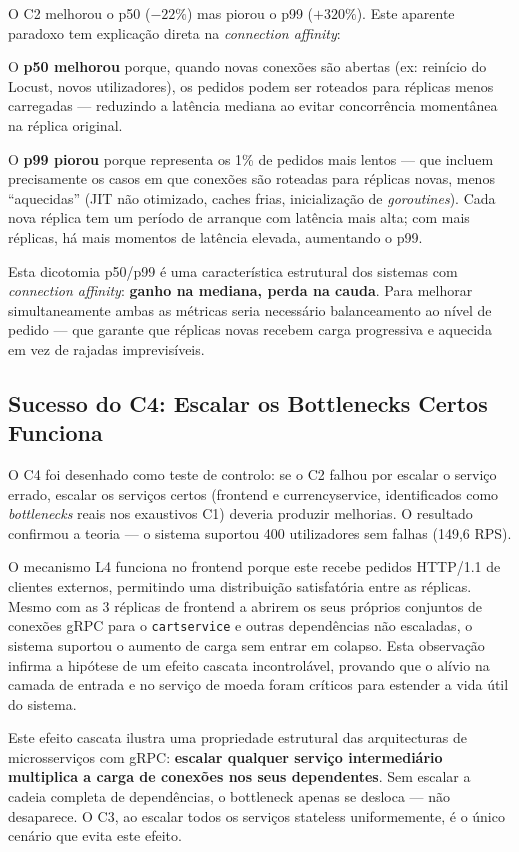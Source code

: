 \documentclass[manuscript,screen,review]{acmart}
\begin{document}
O C2 melhorou o p50 ($-22\%$) mas piorou o p99 ($+320\%$). Este aparente paradoxo tem explicação direta na \textit{connection affinity}:

O \textbf{p50 melhorou} porque, quando novas conexões são abertas (ex: reinício do Locust, novos utilizadores), os pedidos podem ser roteados para réplicas menos carregadas — reduzindo a latência mediana ao evitar concorrência momentânea na réplica original.

O \textbf{p99 piorou} porque representa os 1\% de pedidos mais lentos — que incluem precisamente os casos em que conexões são roteadas para réplicas novas, menos ``aquecidas'' (JIT não otimizado, caches frias, inicialização de \textit{goroutines}). Cada nova réplica tem um período de arranque com latência mais alta; com mais réplicas, há mais momentos de latência elevada, aumentando o p99.

Esta dicotomia p50/p99 é uma característica estrutural dos sistemas com \textit{connection affinity}: \textbf{ganho na mediana, perda na cauda}. Para melhorar simultaneamente ambas as métricas seria necessário balanceamento ao nível de pedido — que garante que réplicas novas recebem carga progressiva e aquecida em vez de rajadas imprevisíveis.

\subsection{Sucesso do C4: Escalar os Bottlenecks Certos Funciona}

O C4 foi desenhado como teste de controlo: se o C2 falhou por escalar o serviço errado, escalar os serviços certos (frontend e currencyservice, identificados como \textit{bottlenecks} reais nos exaustivos C1) deveria produzir melhorias. O resultado confirmou a teoria — o sistema suportou 400 utilizadores sem falhas (149,6 RPS).

O mecanismo L4 funciona no frontend porque este recebe pedidos HTTP/1.1 de clientes externos, permitindo uma distribuição satisfatória entre as réplicas. Mesmo com as 3 réplicas de frontend a abrirem os seus próprios conjuntos de conexões gRPC para o \texttt{cartservice} e outras dependências não escaladas, o sistema suportou o aumento de carga sem entrar em colapso. Esta observação infirma a hipótese de um efeito cascata incontrolável, provando que o alívio na camada de entrada e no serviço de moeda foram críticos para estender a vida útil do sistema.

Este efeito cascata ilustra uma propriedade estrutural das arquitecturas de microsserviços com gRPC: \textbf{escalar qualquer serviço intermediário multiplica a carga de conexões nos seus dependentes}. Sem escalar a cadeia completa de dependências, o bottleneck apenas se desloca — não desaparece. O C3, ao escalar todos os serviços stateless uniformemente, é o único cenário que evita este efeito.
\end{document}
